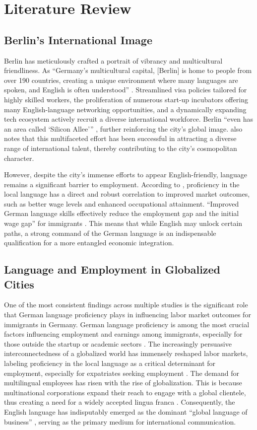 \chapter{Literature Review}
\vspace{5pt}
\section{Berlin’s International Image}
Berlin has meticulously crafted a portrait of vibrancy and multicultural friendliness. As “Germany’s multicultural capital, [Berlin] is home to people from over 190 countries, creating a unique environment where many languages are spoken, and English is often understood” \citep{kummuni25Language}. Streamlined visa policies tailored for highly skilled workers, the proliferation of numerous start-up incubators offering many English-language networking opportunities, and a dynamically expanding tech ecosystem actively recruit a diverse international workforce. Berlin “even has an area called ‘Silicon Allee’” \citep{simplegermany25}, further reinforcing the city’s global image. \citet{bertelsmann} also notes that this multifaceted effort has been successful in attracting a diverse range of international talent, thereby contributing to the city’s cosmopolitan character.

However, despite the city’s immense efforts to appear English-friendly, language remains a significant barrier to employment. According to \citet{berbee24Mig}, proficiency in the local language has a direct and robust correlation to improved market outcomes, such as better wage levels and enhanced occupational attainment. “Improved German language skills effectively reduce the employment gap and the initial wage gap” for immigrants \citep{berbee24Mig}. This means that while English may unlock certain paths, a strong command of the German language is an indispensable qualification for a more entangled economic integration.

\section{Language and Employment in Globalized Cities}
One of the most consistent findings across multiple studies is the significant role that German language proficiency plays in influencing labor market outcomes for immigrants in Germany. German language proficiency is among the most crucial factors influencing employment and earnings among immigrants, especially for those outside the startup or academic sectors \citep{berbee24Mig}. The increasingly persuasive interconnectedness of a globalized world has immensely reshaped labor markets, labeling proficiency in the local language as a critical determinant for employment, especially for expatriates seeking employment \citep{Shohamy06}. The demand for multilingual employees has risen with the rise of globalization. This is because multinational corporations expand their reach to engage with a global clientele, thus creating a need for a widely accepted lingua franca \citep{LinguaFranca}. Consequently, the English language has indisputably emerged as the dominant “global language of business” \citep{Neeley2012}, serving as the primary medium for international communication.

